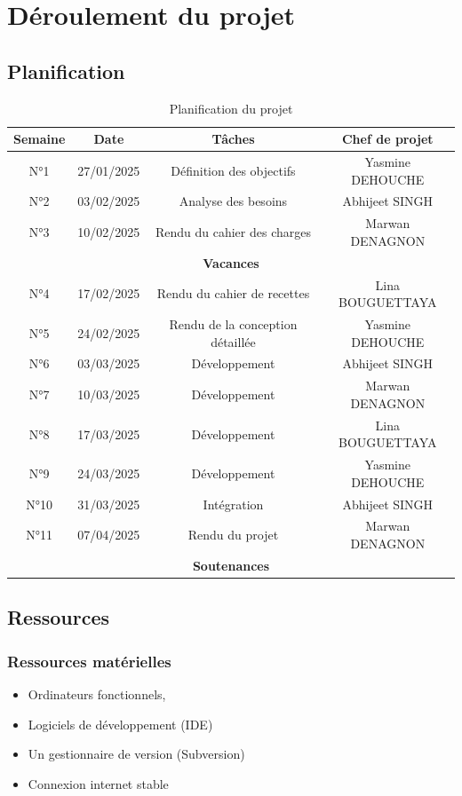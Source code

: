 \documentclass{cahier_des_charges}
\begin{document}
\section{Déroulement du projet}
\subsection{Planification}
\begin{table}[h!]
    \centering
    \begin{tabular}{|c|c|c|c|}
        \hline
        \textbf{Semaine} & \textbf{Date} & \textbf{Tâches} & \textbf{Chef de projet} \\ \hline
        N°1 & 27/01/2025 & Définition des objectifs & Yasmine DEHOUCHE \\ \hline
        N°2 & 03/02/2025 & Analyse des besoins & Abhijeet SINGH \\ \hline
        N°3 & 10/02/2025 & Rendu du cahier des charges & Marwan DENAGNON \\ \hline
        \multicolumn{4}{|c|}{\textbf{Vacances}} \\ \hline
        N°4 & 17/02/2025 & Rendu du cahier de recettes & Lina BOUGUETTAYA \\ \hline
        N°5 & 24/02/2025 & Rendu de la conception détaillée & Yasmine DEHOUCHE \\ \hline
        N°6 & 03/03/2025 & Développement & Abhijeet SINGH \\ \hline
        N°7 & 10/03/2025 & Développement & Marwan DENAGNON \\ \hline
        N°8 & 17/03/2025 & Développement & Lina BOUGUETTAYA \\ \hline
        N°9 & 24/03/2025 & Développement & Yasmine DEHOUCHE \\ \hline
        N°10 & 31/03/2025 & Intégration & Abhijeet SINGH \\ \hline
        N°11 & 07/04/2025 & Rendu du projet & Marwan DENAGNON \\ \hline
        \multicolumn{4}{|c|}{\textbf{Soutenances}} \\ \hline
    \end{tabular}
    \caption{Planification du projet}
    \label{tab:planification}
\end{table}

\subsection{Ressources}
\subsubsection{Ressources matérielles}
\begin{itemize}[label=\textbullet]
 \item Ordinateurs fonctionnels, 
 
 \item Logiciels de développement (IDE)

 \item Un gestionnaire de version (Subversion) 

 \item Connexion internet stable
\end{itemize}
\end{document}
